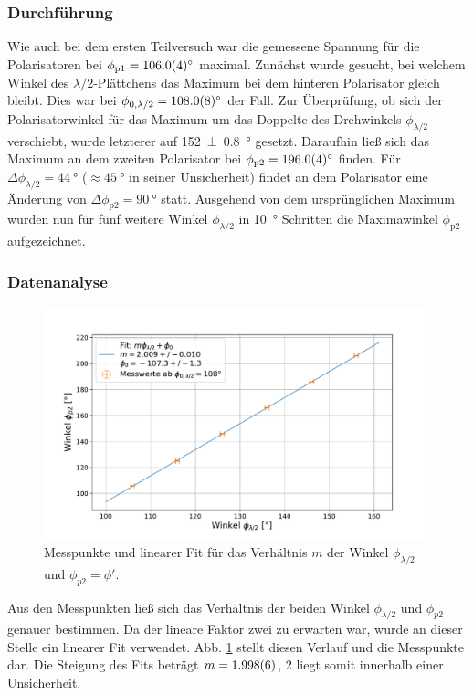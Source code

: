 	\subsubsection*{Durchführung}
	
		Wie auch bei dem ersten Teilversuch war die gemessene Spannung für die Polarisatoren bei $\phi_{\text{p1}} = \SI{106+-0,4}{\degree}$ maximal.
		Zunächst wurde gesucht, bei welchem Winkel des $\lambda/2$-Plättchens das Maximum bei dem hinteren Polarisator gleich bleibt.
		Dies war bei $\phi_{0,\lambda/2} = \SI{108+-0,8}{\degree}$ der Fall.
		Zur Überprüfung, ob sich der Polarisatorwinkel für das Maximum um das Doppelte des Drehwinkels $\phi_{\lambda/2}$ verschiebt, wurde letzterer auf \SI{152+-0,8}{\degree} gesetzt.
		Daraufhin ließ sich das Maximum an dem zweiten Polarisator bei $\phi_{\text{p2}} = \SI{196+-0,4}{\degree}$ finden.
		Für $\Delta\phi_{\lambda/2} = \SI{44}{\degree}$ ($\approx \SI{45}{\degree}$ in seiner Unsicherheit) findet an dem Polarisator eine Änderung von $\Delta\phi_{\text{p2}} = \SI{90}{\degree}$ statt.
		Ausgehend von dem ursprünglichen Maximum wurden nun für fünf weitere Winkel $\phi_{\lambda/2}$ in \SI{10}{\degree} Schritten die Maximawinkel $\phi_\text{p2}$ aufgezeichnet.
	
	\subsubsection*{Datenanalyse}
		
		\begin{figure}[ht]
			\centering
			\includegraphics[width=\textwidth]{data/lambdaPolarisation.pdf}
			\caption{Messpunkte und linearer Fit für das Verhältnis $m$ der Winkel $\phi_{\lambda/2}$ und $\phi_{p2}=\phi'$.}
			\label{fig:LambdaHalbeFit}	
		\end{figure}
		Aus den Messpunkten ließ sich das Verhältnis der beiden Winkel $\phi_{\lambda/2}$ und $\phi_{p2}$ genauer bestimmen.
		Da der lineare Faktor zwei zu erwarten war, wurde an dieser Stelle ein linearer Fit verwendet.
		Abb. \ref{fig:LambdaHalbeFit} stellt diesen Verlauf und die Messpunkte dar.
		Die Steigung des Fits beträgt $m = \SI{1,998+-0,006}{}$, 2 liegt somit innerhalb einer Unsicherheit.
	
